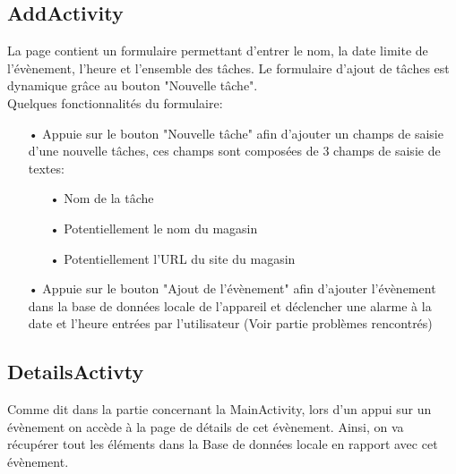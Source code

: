 \documentclass[12pt,a4paper]{report}
\begin{document}
\subsection{AddActivity}
\begin{flushleft}
\justify
La page contient un formulaire permettant d'entrer le nom, la date limite de l'évènement, l'heure et l'ensemble des tâches. Le formulaire d'ajout de tâches est dynamique grâce au bouton "Nouvelle tâche".\\

Quelques fonctionnalités du formulaire:
\begin{itemize}
\item[•] Appuie sur le bouton "Nouvelle tâche" afin d'ajouter un champs de saisie d'une nouvelle tâches, ces champs sont composées de 3 champs de saisie de textes:
\begin{itemize}
\item[•] Nom de la tâche
\item[•] Potentiellement le nom du magasin
\item[•] Potentiellement l'URL du site du magasin
\end{itemize}
\item[•] Appuie sur le bouton "Ajout de l'évènement" afin d'ajouter l'évènement dans la base de données locale de l'appareil et déclencher une alarme à la date et l'heure entrées par l'utilisateur (Voir partie problèmes rencontrés)
\end{itemize}
\end{flushleft}
\subsection{DetailsActivty}
\begin{flushleft}
\justify
Comme dit dans la partie concernant la MainActivity, lors d'un appui sur un évènement on accède à la page de détails de cet évènement. Ainsi, on va récupérer tout les éléments dans la Base de données locale en rapport avec cet évènement.
\end{flushleft}
\end{document}
